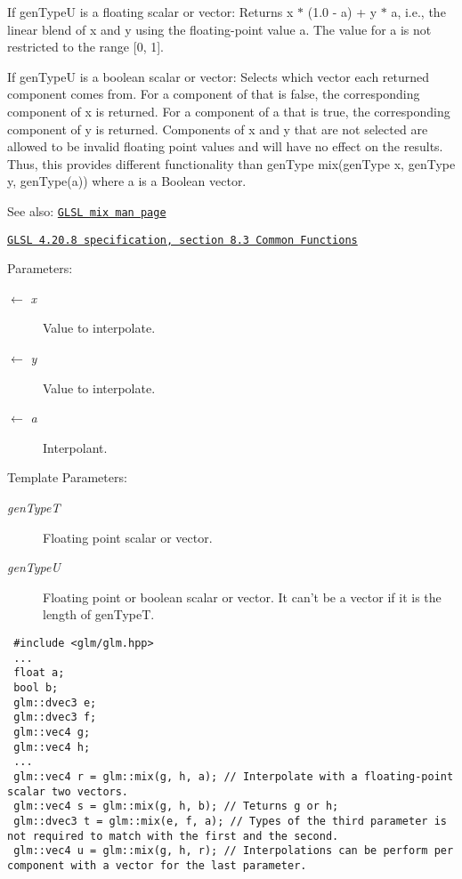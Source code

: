 If genTypeU is a floating scalar or vector: Returns x $\ast$ (1.0 - a) + y $\ast$ a, i.e., the linear blend of x and y using the floating-point value a. The value for a is not restricted to the range \mbox{[}0, 1\mbox{]}.

If genTypeU is a boolean scalar or vector: Selects which vector each returned component comes from. For a component of  that is false, the corresponding component of x is returned. For a component of a that is true, the corresponding component of y is returned. Components of x and y that are not selected are allowed to be invalid floating point values and will have no effect on the results. Thus, this provides different functionality than genType mix(genType x, genType y, genType(a)) where a is a Boolean vector.

\begin{Desc}
\item[See also:]\href{http://www.opengl.org/sdk/docs/manglsl/xhtml/mix.xml}{\tt GLSL mix man page} 

\href{http://www.opengl.org/registry/doc/GLSLangSpec.4.20.8.pdf}{\tt GLSL 4.20.8 specification, section 8.3 Common Functions}\end{Desc}
\begin{Desc}
\item[Parameters:]
\begin{description}
\item[\mbox{$\leftarrow$} {\em x}]Value to interpolate. \item[\mbox{$\leftarrow$} {\em y}]Value to interpolate. \item[\mbox{$\leftarrow$} {\em a}]Interpolant.\end{description}
\end{Desc}
\begin{Desc}
\item[Template Parameters:]
\begin{description}
\item[{\em genTypeT}]Floating point scalar or vector. \item[{\em genTypeU}]Floating point or boolean scalar or vector. It can't be a vector if it is the length of genTypeT.\end{description}
\end{Desc}


\begin{Code}\begin{verbatim} #include <glm/glm.hpp>
 ...
 float a;
 bool b;
 glm::dvec3 e;
 glm::dvec3 f;
 glm::vec4 g;
 glm::vec4 h;
 ...
 glm::vec4 r = glm::mix(g, h, a); // Interpolate with a floating-point scalar two vectors. 
 glm::vec4 s = glm::mix(g, h, b); // Teturns g or h;
 glm::dvec3 t = glm::mix(e, f, a); // Types of the third parameter is not required to match with the first and the second.
 glm::vec4 u = glm::mix(g, h, r); // Interpolations can be perform per component with a vector for the last parameter.
\end{verbatim}
\end{Code}

